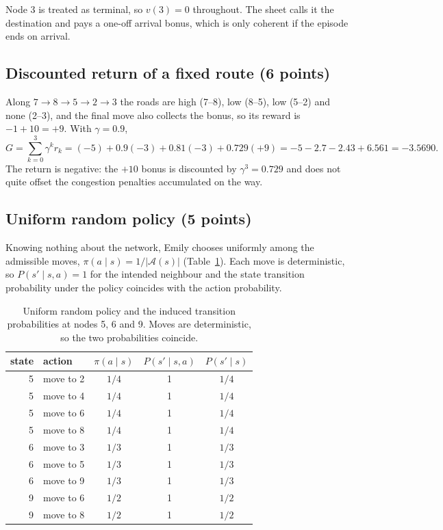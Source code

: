 \documentclass[11pt,a4paper]{article}
\begin{document}
Node 3 is treated as terminal, so $v(3)=0$ throughout. The sheet calls it the
destination and pays a one-off arrival bonus, which is only coherent if the episode
ends on arrival.

\subsection{Discounted return of a fixed route (6 points)}

Along $7\to8\to5\to2\to3$ the roads are high (7--8), low (8--5), low (5--2) and none
(2--3), and the final move also collects the bonus, so its reward is $-1+10=+9$. With
$\gamma=0.9$,
\begin{equation}
G=\sum_{k=0}^{3}\gamma^{k}r_{k}
=(-5)+0.9(-3)+0.81(-3)+0.729(+9)
=-5-2.7-2.43+6.561
=-3.5690.
\end{equation}
The return is negative: the $+10$ bonus is discounted by $\gamma^{3}=0.729$ and does
not quite offset the congestion penalties accumulated on the way.

\subsection{Uniform random policy (5 points)}

Knowing nothing about the network, Emily chooses uniformly among the admissible
moves, $\pi(a\mid s)=1/|\mathcal{A}(s)|$ (Table~\ref{tab:p32}). Each move is deterministic, so
$P(s'\mid s,a)=1$ for the intended neighbour and the state transition probability
under the policy coincides with the action probability.

\begin{table}[H]
\centering
\caption{Uniform random policy and the induced transition probabilities at nodes 5, 6 and 9. Moves are deterministic, so the two probabilities coincide.}
\label{tab:p32}
\begin{tabular}{rlccc}
\toprule
state & action & $\pi(a\mid s)$ & $P(s'\mid s,a)$ & $P(s'\mid s)$ \\
\midrule
5 & move to 2 & $1/4$ & 1 & $1/4$ \\
5 & move to 4 & $1/4$ & 1 & $1/4$ \\
5 & move to 6 & $1/4$ & 1 & $1/4$ \\
5 & move to 8 & $1/4$ & 1 & $1/4$ \\
6 & move to 3 & $1/3$ & 1 & $1/3$ \\
6 & move to 5 & $1/3$ & 1 & $1/3$ \\
6 & move to 9 & $1/3$ & 1 & $1/3$ \\
9 & move to 6 & $1/2$ & 1 & $1/2$ \\
9 & move to 8 & $1/2$ & 1 & $1/2$ \\
\bottomrule
\end{tabular}
\end{table}
\end{document}
